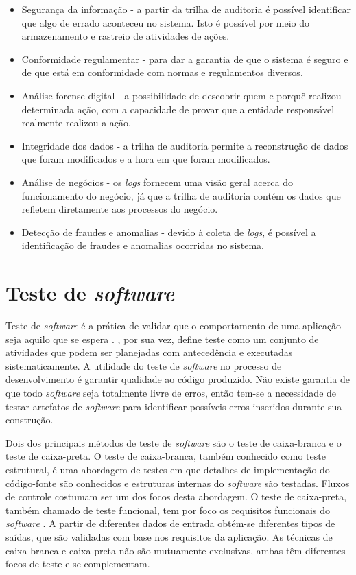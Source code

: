 \begin{itemize}
    \item Segurança da informação - a partir da trilha de auditoria é possível identificar que algo de errado aconteceu no sistema. Isto é possível por meio do armazenamento e rastreio de atividades de ações.

    \item Conformidade regulamentar - para dar a garantia de que o sistema é seguro e de que está em conformidade com normas e regulamentos diversos.

    \item Análise forense digital - a possibilidade de descobrir quem e porquê realizou determinada ação, com a capacidade de provar que a entidade responsável realmente realizou a ação.

    \item Integridade dos dados - a trilha de auditoria permite a reconstrução de dados que foram modificados e a hora em que foram modificados.

    \item Análise de negócios - os \emph{logs} fornecem uma visão geral acerca do funcionamento do negócio, já que a trilha de auditoria contém os dados que refletem diretamente aos processos do negócio.

    \item Detecção de fraudes e anomalias - devido à coleta de \emph{logs}, é possível a identificação de fraudes e anomalias ocorridas no sistema.
\end{itemize}


\section{Teste de \emph{software}}
Teste de \emph{software} é a prática de validar que o comportamento de uma aplicação seja aquilo que se espera \cite{Mohan2022-ch}. \cite{Pressman2021-jj}, por sua vez, define teste como um conjunto de atividades que podem ser planejadas com antecedência e executadas sistematicamente. A utilidade do teste de \emph{software} no processo de desenvolvimento é garantir qualidade ao código produzido. Não existe garantia de que todo \emph{software} seja totalmente livre de erros, então tem-se a necessidade de testar artefatos de \emph{software} para identificar possíveis erros inseridos durante sua construção.

Dois dos principais métodos de teste de \emph{software} são o teste de caixa-branca e o teste de caixa-preta. O teste de caixa-branca, também conhecido como teste estrutural, é uma abordagem de testes em que detalhes de implementação do código-fonte são conhecidos e estruturas internas do \emph{software} são testadas. Fluxos de controle costumam ser um dos focos desta abordagem. O teste de caixa-preta, também chamado de teste funcional, tem por foco os requisitos funcionais do \emph{software} \cite{Pressman2021-jj}. A partir de diferentes dados de entrada obtém-se diferentes tipos de saídas, que são validadas com base nos requisitos da aplicação. As técnicas de caixa-branca e caixa-preta não são mutuamente exclusivas, ambas têm diferentes focos de teste e se complementam.


